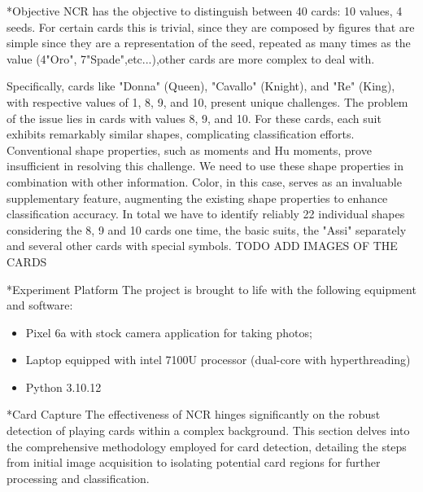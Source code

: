 \documentclass[twocolumn, a4paper,10pt]{article}
\makeatletter
\renewcommand\subsection{\@startsection{subsection}{1}{\z@}{\z@}{\z@}{\normalfont\normalsize\bfseries}}
\renewcommand\subsection{\@startsection{subsection}{1}{\z@}{\z@}{0.1pt}{\normalfont\normalsize\bfseries}}
\makeatother
\begin{document}
\subsection*{Objective}
NCR has the objective to distinguish between 40 cards: 10 values, 4 seeds.
For certain cards this is trivial, since they are composed by figures that are simple since they are a representation of the seed, repeated as many times as the value (4"Oro", 7"Spade",etc...),other cards are more complex to deal with.

Specifically, cards like "Donna" (Queen), "Cavallo" (Knight), and "Re" (King), with respective values of 1, 8, 9, and 10, present unique challenges. The problem of the issue lies in cards with values 8, 9, and 10. For these cards, each suit exhibits remarkably similar shapes, complicating classification efforts.
Conventional shape properties, such as moments and Hu moments, prove insufficient in resolving this challenge. We need to use these shape properties in combination with other information. 
Color, in this case, serves as an invaluable supplementary feature, augmenting the existing shape properties to enhance classification accuracy.
In total we have to identify reliably 22 individual shapes considering the 8, 9 and 10 cards one time, the basic suits, the "Assi" separately and several other cards with special symbols.
TODO ADD IMAGES OF THE CARDS

\subsection*{Experiment Platform}
The project is brought to life with the following equipment and software:
\begin{itemize}
  \item Pixel 6a with stock camera application for taking photos;
  \item Laptop equipped with intel 7100U processor (dual-core with hyperthreading)
  \item Python 3.10.12 

\end{itemize}

\subsection*{Card Capture}
The effectiveness of NCR hinges significantly on the robust detection of playing cards within a complex background. This section delves into the comprehensive methodology employed for card detection, detailing the steps from initial image acquisition to isolating potential card regions for further processing and classification.
\end{document}
